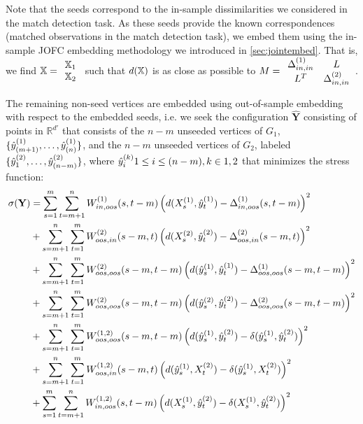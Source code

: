 \documentclass[12pt,oneside,final]{thesis}\usepackage[]{graphicx}\usepackage[]{color}
\begin{document}
Note that the seeds correspond to the in-sample dissimilarities we considered in the match detection task. As these seeds provide the known correspondences (matched observations in the match detection task), we embed them using the in-sample JOFC embedding methodology we introduced in \ref{sec:jointembed}. That is, we find $\mathbb{X}= \begin{array}{c}
\mathbb{X}_1 \\
\mathbb{X}_2
\end{array}$ such that $d(\mathbb{X})$ is as close as possible to $M= \begin{array}{cc}
{\Delta}^{(1)}_{in,in} & L \\
 L^T &{\Delta}^{(2)}_{in,in}
\end{array}  $.

The remaining non-seed vertices are embedded using out-of-sample embedding with respect to the embedded seeds, i.e. we seek the configuration ${ \hat{\mathbf{Y}}}$ consisting of points in $\mathbb{R}^{d'}$ that consists of the $n-m$ unseeded vertices of $G_1$,  $\{\hat{y}^{(1)}_{(m+1)},\ldots,\hat{y}^{(1)}_{(n)}\}$, and the $n-m$ unseeded vertices of $G_2$, labeled  $\{\hat{y}^{(2)}_1,\ldots,\hat{y}^{(2)}_{(n-m)}\}$, where $\hat{y}_{i}^{(k)} 1\leq i \leq (n-m), k \in {1,2}$  that minimizes the stress function:
\begin{align}
\sigma({\bf Y})&=\sum_{s=1}^{m}\sum_{t=m+1}^{n} {W^{(1)}_{in,oos}(s,t-m)  \left(d(X^{(1)}_{s},\hat{y}_t^{(1)})-{\Delta}^{(1)}_{in,oos}(s,t-m)\right)^2 } \label{eq:oos}\\
&+\sum_{s=m+1}^{n}\sum_{t=1}^{m}
{W^{(2)}_{oos,in}(s-m,t)  \left(d(X^{(2)}_{s},\hat{y}_t^{(2)})-{\Delta}^{(2)}_{oos,in}(s-m,t)\right)^2}  \label{eq:oos2}\\
&+\sum_{s=m+1}^{n}\sum_{t=1}^{m} 
{W^{(2)}_{oos,oos}(s-m,t-m) \left(d(\hat{y}_s^{(1)},\hat{y}_t^{(1)})-{\Delta}^{(1)}_{oos,oos}(s-m,t-m)\right)^2} \label{eq:oos3}\\
&+\sum_{s=m+1}^{n}\sum_{t=1}^{m} 
{W^{(2)}_{oos,oos}(s-m,t-m) \left(d(\hat{y}_s^{(2)},\hat{y}_t^{(2)})-{\Delta}^{(2)}_{oos,oos}(s-m,t-m)\right)^2} \label{eq:oos4} \\
&+\sum_{s=m+1}^{n} \sum_{t=1}^{m}
W^{(1,2)}_{oos,oos}(s-m,t-m) \left(d(\hat{y}_s^{(1)},\hat{y}_t^{(2)})-\delta(\hat{y}_s^{(1)},\hat{y}_t^{(2)})\right)^2 \label{eq:oos5}\\
&+\sum_{s=m+1}^{n} \sum_{t=1}^{m}
W^{(1,2)}_{oos,in}(s-m,t) \left(d(\hat{y}_s^{(1)},X^{(2)}_{t})-\delta(\hat{y}_s^{(1)},X^{(2)}_{t})\right)^2 \label{eq:oos6}\\
&+\sum_{s=1}^{m} \sum_{t=m+1}^{n}
W^{(1,2)}_{in,oos}(s,t-m) \left(d(X^{(1)}_{s},\hat{y}_t^{(2)})-\delta(X^{(1)}_{s},\hat{y}_t^{(2)})\right)^2 \label{eq:oos7}
\end{align}
\end{document}
